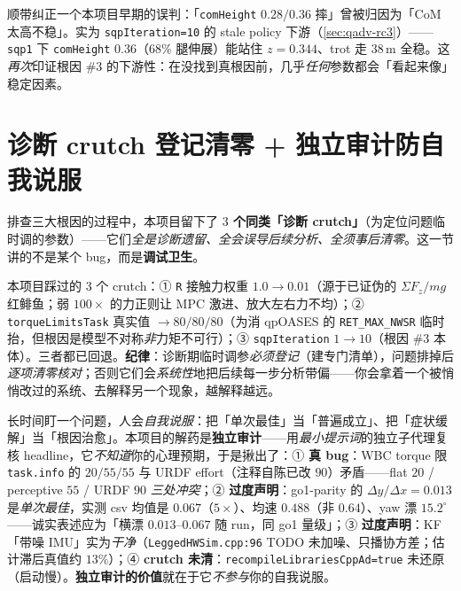 \begin{note}
顺带纠正一个本项目早期的误判：「\texttt{comHeight} $0.28/0.36$ 摔」曾被归因为「CoM 太高不稳」。实为 \texttt{sqpIteration=10} 的 stale policy 下游（\cref{sec:qadv-rc3}）——\texttt{sqp1} 下 \texttt{comHeight} $0.36$（$68\%$ 腿伸展）能站住 $z{=}0.344$、trot 走 $38$\,m 全稳。这\emph{再次}印证根因 \#3 的下游性：在没找到真根因前，几乎\emph{任何}参数都会「看起来像」稳定因素。
\end{note}

\section{诊断 crutch 登记清零 + 独立审计防自我说服}
\label{sec:qadv-crutch}

排查三大根因的过程中，本项目留下了 \textbf{$3$ 个同类「诊断 crutch」}（为定位问题临时调的参数）——它们\emph{全是诊断遗留、全会误导后续分析、全须事后清零}。这一节讲的不是某个 bug，而是\textbf{调试卫生}。

\begin{insight}\label{ins:qadv-crutch-log}
本项目踩过的 $3$ 个 crutch：① \texttt{R} 接触力权重 $1.0\to0.01$（源于已证伪的 $\Sigma F_z/mg$ 红鲱鱼；弱 $100\times$ 的力正则让 MPC 激进、放大左右力不均）；② \texttt{torqueLimitsTask} 真实值 $\to80/80/80$（为消 qpOASES 的 \texttt{RET\_MAX\_NWSR} 临时抬，但根因是模型不对称\emph{非}力矩不可行）；③ \texttt{sqpIteration} $1\to10$（根因 \#3 本体）。三者都已回退。\textbf{纪律}：诊断期临时调参\emph{必须登记}（建专门清单），问题排掉后\emph{逐项清零核对}；否则它们会\emph{系统性}地把后续每一步分析带偏——你会拿着一个被悄悄改过的系统、去解释另一个现象，越解释越远。
\end{insight}

\begin{insight}[独立审计防自我说服]\label{ins:qadv-audit}
长时间盯一个问题，人会\emph{自我说服}：把「单次最佳」当「普遍成立」、把「症状缓解」当「根因治愈」。本项目的解药是\textbf{独立审计}——用\emph{最小提示词}的独立子代理复核 headline，它\emph{不知道}你的心理预期，于是揪出了：① \textbf{真 bug}：WBC torque 限 \texttt{task.info} 的 $20/55/55$ 与 URDF effort（注释自陈已改 $90$）矛盾——flat $20$ / perceptive $55$ / URDF $90$ \emph{三处冲突}；② \textbf{过度声明}：go1-parity 的 $\Delta y/\Delta x{=}0.013$ 是\emph{单次最佳}，实测 csv 均值是 $0.067$（$5\times$）、均速 $0.488$（非 $0.64$）、yaw 漂 $15.2^\circ$——诚实表述应为「横漂 $0.013$–$0.067$ 随 run，同 go1 量级」；③ \textbf{过度声明}：KF「带噪 IMU」实为\emph{干净}（\texttt{LeggedHWSim.cpp:96} TODO 未加噪、只播协方差；估计滞后真值约 $13\%$）；④ \textbf{crutch 未清}：\texttt{recompileLibrariesCppAd=true} 未还原（启动慢）。\textbf{独立审计的价值}就在于它\emph{不参与}你的自我说服。
\end{insight}

